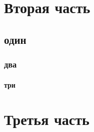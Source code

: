 \documentclass[paper=a4, fontsize=14pt, pagesize, DIV=calc, oneside]{scrreport}
\begin{document}



\chapter{Вторая часть}














\section{один}














\subsection{два}














\subsubsection{три}






\chapter{Третья часть}
\end{document}
